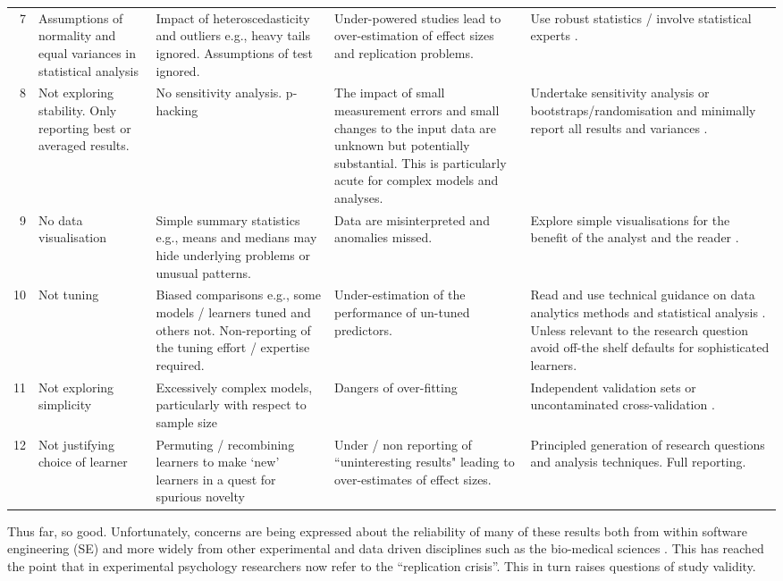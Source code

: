 \documentclass[10pt]{elsarticle}
\begin{document}
\begin{table}
\begin{center}
\begin{tabular}{|r|p{1.7cm}|p{2.3cm}|p{2.5cm}|p{3cm}|}
7  & Assumptions of normality and equal variances in statistical analysis & Impact of heteroscedasticity and outliers e.g., heavy tails ignored.  Assumptions of test ignored.  & Under-powered studies lead to over-estimation of effect sizes and replication problems. & Use robust statistics / involve statistical experts \cite{Kitc02,Wilc12}.\\
\rowcolor{gray!50}8 & Not exploring stability.  Only reporting best or averaged results. & No sensitivity analysis. p-hacking & The impact of small measurement errors and small changes to the input data are unknown but potentially substantial.  This is particularly acute for complex models and analyses. & Undertake sensitivity analysis or bootstraps/randomisation and minimally report all results and variances \cite{Manl97,Salt00}.\\
9 & No data visualisation & Simple summary statistics e.g., means and medians may hide underlying problems or unusual patterns. & Data are misinterpreted and anomalies missed. & Explore simple visualisations for the benefit of the analyst and the reader \cite{Mya09,Heal18}.\\
\rowcolor{gray!50}
10 & Not tuning & Biased comparisons e.g., some models / learners tuned and others not. Non-reporting of the tuning effort / expertise required. & Under-estimation of the performance of un-tuned predictors. & Read and use technical guidance on data analytics methods and statistical analysis \cite{Snoe12,fu2016}.  Unless relevant to the research question avoid off-the shelf defaults for sophisticated learners.\\
11 & Not exploring simplicity & Excessively complex models, particularly with respect to sample size  & Dangers of over-fitting & Independent validation sets or uncontaminated cross-validation \cite{Cawl10}. \\
\rowcolor{gray!50} 
12 & Not justifying choice of learner & Permuting / recombining learners to make `new' learners in a quest for spurious novelty & Under / non reporting of ``uninteresting results" leading to over-estimates of effect sizes. & Principled generation of research questions and analysis techniques. Full reporting. \\
\hline
\end{tabular}
\end{center}
\label{Tab:BadSmells}
\end{table}%

Thus far, so good.  Unfortunately, concerns are being expressed about the reliability of many of these results both from within software engineering (SE) \cite{Shep14,Jorg16} and more widely from other experimental and data driven disciplines such as the bio-medical sciences \cite{Ioan05,Earp15}.  This has reached the point that in experimental psychology researchers now refer to the ``replication crisis''.  This in turn raises questions of study validity.
\end{document}
